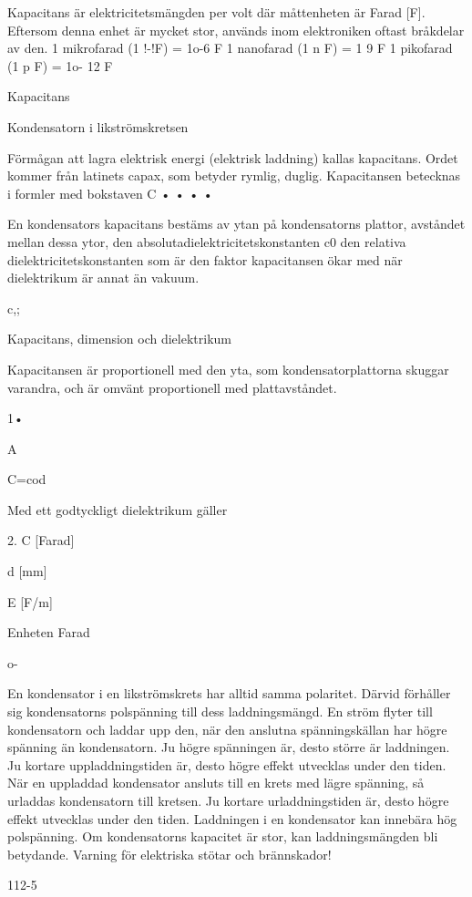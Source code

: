 Kapacitans är elektricitetsmängden per volt
där måttenheten är Farad [F]. Eftersom denna
enhet är mycket stor, används inom elektroniken oftast bråkdelar av den.
1 mikrofarad (1 !-!F) = 1o-6 F
1 nanofarad (1 n F) = 1 9 F
1 pikofarad (1 p F) = 1o- 12 F

Kapacitans

Kondensatorn i likströmskretsen

Förmågan att lagra elektrisk energi (elektrisk laddning) kallas kapacitans. Ordet kommer från latinets capax, som betyder rymlig,
duglig.
Kapacitansen betecknas i formler med
bokstaven C
•
•
•
•

En kondensators kapacitans bestäms av
ytan på kondensatorns plattor,
avståndet mellan dessa ytor,
den absolutadielektricitetskonstanten c0
den relativa dielektricitetskonstanten
som är den faktor kapacitansen ökar med
när dielektrikum är annat än vakuum.

c,;

Kapacitans, dimension och dielektrikum

Kapacitansen är proportionell med den yta,
som kondensatorplattorna skuggar varandra, och är omvänt proportionell med plattavståndet.

1•

A

C=cod

Med ett godtyckligt dielektrikum gäller

2.
C [Farad]

d [mm]

E [F/m]

Enheten Farad

o-

En kondensator i en likströmskrets har alltid
samma polaritet. Därvid förhåller sig kondensatorns polspänning till dess laddningsmängd.
En ström flyter till kondensatorn och laddar upp den, när den anslutna spänningskällan har högre spänning än kondensatorn. Ju
högre spänningen är, desto större är laddningen. Ju kortare uppladdningstiden är, desto högre effekt utvecklas under den tiden.
När en uppladdad kondensator ansluts
till en krets med lägre spänning, så urladdas
kondensatorn till kretsen. Ju kortare urladdningstiden är, desto högre effekt utvecklas
under den tiden.
Laddningen i en kondensator kan innebära hög polspänning. Om kondensatorns
kapacitet är stor, kan laddningsmängden bli
betydande. Varning för elektriska stötar och
brännskador!

112-5

